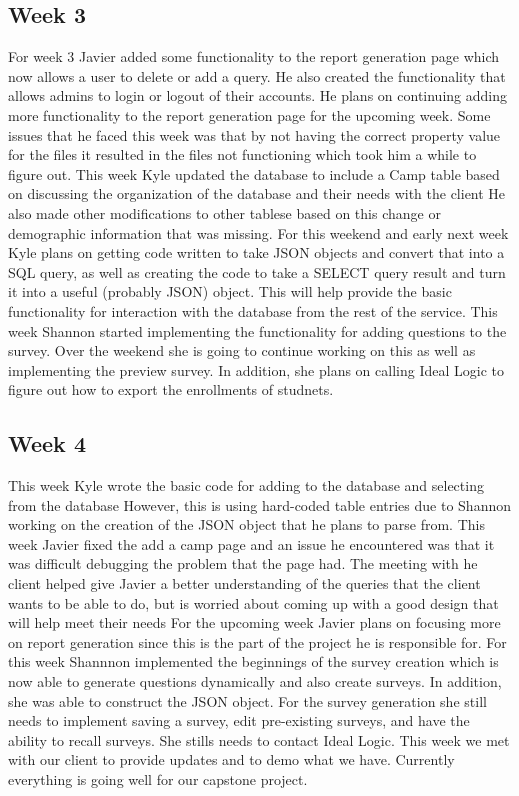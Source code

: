 \documentclass[letterpaper,10pt,serif, draftclsnofoot,onecolumn, compsoc, titlepage]{IEEEtran}
\begin{document}
\subsection{Week 3}
For week 3 Javier added some functionality to the report generation page which now allows a user to delete or add a query.
He also created the functionality that allows admins to login or logout of their accounts.
He plans on continuing adding more functionality to the report generation page for the upcoming week.
Some issues that he faced this week was that by not having the correct property value for the files it resulted in the files not functioning which took him a while to figure out.
This week Kyle updated the database to include a Camp table based on discussing the organization of the database and their needs with the client
 He also made other modifications to other tablese based on this change or demographic information that was missing.
For this weekend and early next week Kyle plans on getting code written to take JSON objects and convert that into a SQL query, as well as creating the code to take a SELECT query result and turn it into a useful (probably JSON) object.
This will help provide the basic functionality for interaction with the database from the rest of the service.
This week Shannon started implementing the functionality for adding questions to the survey.
Over the weekend she is going to continue working on this as well as implementing the preview survey.
In addition, she plans on calling Ideal Logic to figure out how to export the enrollments of studnets. 

\subsection{Week 4}
This week Kyle wrote the basic code for adding to the database and selecting from the database
 However, this is using hard-coded table entries due to Shannon working on the creation of the JSON object that he plans to parse from.
This week Javier fixed the add a camp page and an issue he encountered was that it was difficult debugging the problem that the page had.
The meeting with he client helped give Javier a better understanding of the queries that the client wants to be able to do, but is worried about coming up with a good design that will help meet their needs
For the upcoming week Javier plans on focusing more on report generation since this is the part of the project he is responsible for.
For this week Shannnon implemented the beginnings of the survey creation which is now able to generate questions dynamically and also create surveys.
In addition, she was able to construct the JSON object.
For the survey generation she still needs to implement saving a survey, edit pre-existing surveys, and have the ability to recall surveys.
She stills needs to contact Ideal Logic.
This week we met with our client to provide updates and to demo what we have.
Currently everything is going well for our capstone project. 
\end{document}
